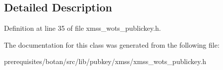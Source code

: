 \subsection{Detailed Description}


Definition at line 35 of file xmss\+\_\+wots\+\_\+publickey.\+h.



The documentation for this class was generated from the following file\+:\begin{DoxyCompactItemize}
\item 
prerequisites/botan/src/lib/pubkey/xmss/xmss\+\_\+wots\+\_\+publickey.\+h\end{DoxyCompactItemize}
